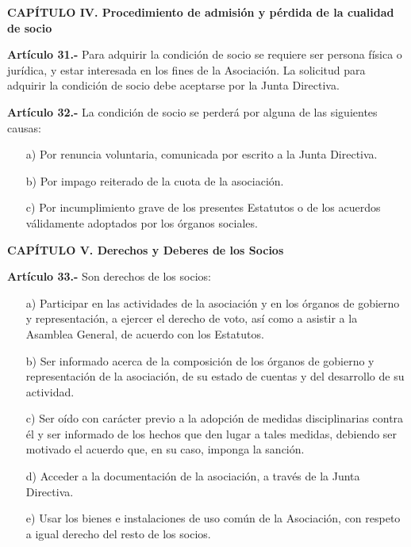\documentclass[a4paper,12pt]{article}
\begin{document}
\begin{onehalfspace}
\bigskip\bigskip

\begin{center}
\textbf{CAP\'ITULO IV. Procedimiento de admisi\'on y p\'erdida de la cualidad de socio}
\end{center}

\bigskip\bigskip

\textbf{Art\'iculo 31.-} Para adquirir la condici\'on de socio se requiere ser persona f\'isica o jur\'idica, y estar interesada en los fines de la Asociaci\'on. La solicitud para adquirir la condici\'on de socio debe aceptarse por la Junta Directiva.

\bigskip\bigskip

\textbf{Art\'iculo 32.-} La condici\'on de socio se perder\'a por alguna de las siguientes causas:
\begin{itemize}
\item [a)] Por renuncia voluntaria, comunicada por escrito a la Junta Directiva.
\item [b)] Por impago reiterado de la cuota de la asociaci\'on.
\item [c)] Por incumplimiento grave de los presentes Estatutos o de los acuerdos v\'alidamente adoptados por los \'organos sociales.
\end{itemize}

\bigskip\bigskip
\newpage
\begin{center}
\textbf{CAP\'ITULO V. Derechos y Deberes de los Socios}
\end{center}

\bigskip\bigskip

\textbf{Art\'iculo 33.-} Son derechos de los socios:
\begin{itemize}
\item [a)] Participar en las actividades de la asociaci\'on y en los \'organos de gobierno y representaci\'on, a ejercer el derecho de voto, as\'i como a asistir a la Asamblea General, de acuerdo con los Estatutos.
\item [b)] Ser informado acerca de la composici\'on de los \'organos de gobierno y representaci\'on de la asociaci\'on, de su estado de cuentas y del desarrollo de su actividad.
\item [c)] Ser o\'ido con car\'acter previo a la adopci\'on de medidas disciplinarias contra \'el y ser informado de los hechos que den lugar a tales medidas, debiendo ser motivado el acuerdo que, en su caso, imponga la sanci\'on.
\item [d)] Acceder a la documentaci\'on de la asociaci\'on, a trav\'es de la Junta Directiva.
\item [e)] Usar los bienes e instalaciones de uso com\'un de la Asociaci\'on, con respeto a igual derecho del resto de los socios.
\end{itemize}


\end{onehalfspace}
\end{document}
